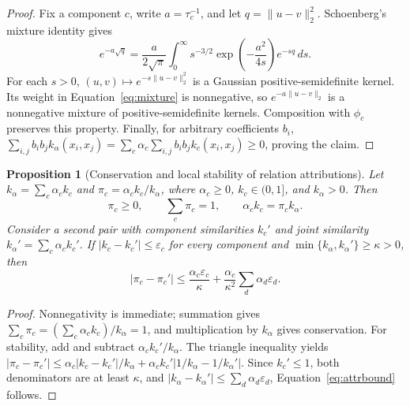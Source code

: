 \documentclass[pdflatex,sn-mathphys-num]{sn-jnl}
\newcommand{\1}{\mathbf{1}}
\theoremstyle{plain}
\newtheorem{proposition}{Proposition}
\begin{document}
	\begin{proof}
		Fix a component $c$, write $a=\tau_c^{-1}$, and let
		$q=\|u-v\|_2^2$. Schoenberg's mixture identity
		\cite{schoenberg1938metric} gives
		\begin{equation}
			e^{-a\sqrt{q}}
			=
			\frac{a}{2\sqrt{\pi}}
			\int_0^\infty
			s^{-3/2}
			\exp\!\left(-\frac{a^2}{4s}\right)
			e^{-sq}\,ds.
			\label{eq:mixture}
		\end{equation}
		For each $s>0$, $(u,v)\mapsto e^{-s\|u-v\|_2^2}$ is a Gaussian positive-semidefinite kernel. Its weight in Equation~\eqref{eq:mixture} is nonnegative, so $e^{-a\|u-v\|_2}$ is a nonnegative mixture of positive-semidefinite kernels. Composition with $\phi_c$ preserves this property. Finally, for arbitrary coefficients $b_i$, $\sum_{i,j}b_ib_jk_\alpha(x_i,x_j)=\sum_c\alpha_c\sum_{i,j}b_ib_jk_c(x_i,x_j)\geq0$, proving the claim.
	\end{proof}
	
	\begin{proposition}[Conservation and local stability of relation attributions]
		\label{prop:attr}
		Let $k_\alpha=\sum_c\alpha_ck_c$ and $\pi_c=\alpha_ck_c/k_\alpha$, where $\alpha_c\geq0$, $k_c\in(0,1]$, and $k_\alpha>0$. Then
		\begin{equation}
			\pi_c\geq0,
			\qquad
			\sum_c\pi_c=1,
			\qquad
			\alpha_ck_c=\pi_ck_\alpha.
			\label{eq:attr_conservation}
		\end{equation}
		Consider a second pair with component similarities $k_c'$ and joint
		similarity $k_\alpha'=\sum_c\alpha_ck_c'$. If $|k_c-k_c'|\leq\varepsilon_c$ for every component and $\min\{k_\alpha,k_\alpha'\}\geq\kappa>0$, then
		\begin{equation}
			|\pi_c-\pi_c'|
			\leq
			\frac{\alpha_c\varepsilon_c}{\kappa}
			+
			\frac{\alpha_c}{\kappa^2}
			\sum_d\alpha_d\varepsilon_d.
			\label{eq:attrbound}
		\end{equation}
	\end{proposition}
	
	\begin{proof}
		Nonnegativity is immediate; summation gives $\sum_c\pi_c=(\sum_c\alpha_ck_c)/k_\alpha=1$, and multiplication by $k_\alpha$ gives conservation. For stability, add and subtract $\alpha_ck_c'/k_\alpha$. The triangle inequality yields $|\pi_c-\pi_c'|\leq\alpha_c|k_c-k_c'|/k_\alpha+\alpha_ck_c'|1/k_\alpha-1/k_\alpha'|$. Since $k_c'\leq1$, both denominators are at least $\kappa$, and $|k_\alpha-k_\alpha'|\leq\sum_d\alpha_d\varepsilon_d$, Equation~\eqref{eq:attrbound} follows.
	\end{proof}
	
\end{document}
